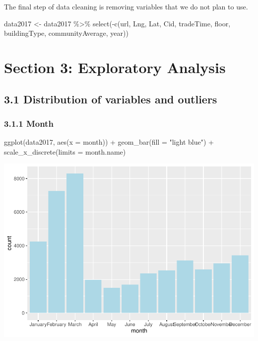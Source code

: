 \documentclass[
]{article}
\newenvironment{Shaded}{\begin{snugshade}}{\end{snugshade}}
\newcommand{\AttributeTok}[1]{\textcolor[rgb]{0.77,0.63,0.00}{#1}}
\newcommand{\FunctionTok}[1]{\textcolor[rgb]{0.00,0.00,0.00}{#1}}
\newcommand{\NormalTok}[1]{#1}
\newcommand{\OtherTok}[1]{\textcolor[rgb]{0.56,0.35,0.01}{#1}}
\newcommand{\SpecialCharTok}[1]{\textcolor[rgb]{0.00,0.00,0.00}{#1}}
\newcommand{\StringTok}[1]{\textcolor[rgb]{0.31,0.60,0.02}{#1}}
\begin{document}
The final step of data cleaning is removing variables that we do not
plan to use.

\begin{Shaded}
\begin{Highlighting}[]
\NormalTok{data2017 }\OtherTok{\textless{}{-}}\NormalTok{ data2017 }\SpecialCharTok{\%\textgreater{}\%}
  \FunctionTok{select}\NormalTok{(}\SpecialCharTok{{-}}\FunctionTok{c}\NormalTok{(url, Lng, Lat, Cid, tradeTime, floor, buildingType, communityAverage, year))}
\end{Highlighting}
\end{Shaded}

\hypertarget{section-3-exploratory-analysis}{%
\section{Section 3: Exploratory
Analysis}\label{section-3-exploratory-analysis}}

\hypertarget{distribution-of-variables-and-outliers}{%
\subsection{3.1 Distribution of variables and
outliers}\label{distribution-of-variables-and-outliers}}

\hypertarget{month}{%
\subsubsection{3.1.1 Month}\label{month}}

\begin{Shaded}
\begin{Highlighting}[]
\FunctionTok{ggplot}\NormalTok{(data2017, }\FunctionTok{aes}\NormalTok{(}\AttributeTok{x =}\NormalTok{ month)) }\SpecialCharTok{+} 
  \FunctionTok{geom\_bar}\NormalTok{(}\AttributeTok{fill =} \StringTok{"light blue"}\NormalTok{) }\SpecialCharTok{+} 
  \FunctionTok{scale\_x\_discrete}\NormalTok{(}\AttributeTok{limits =}\NormalTok{ month.name)}
\end{Highlighting}
\end{Shaded}

\includegraphics{Project_files/figure-latex/unnamed-chunk-9-1.pdf}
\end{document}
